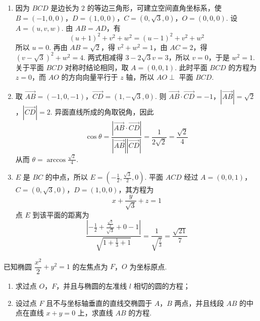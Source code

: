 \begin{solution}
\begin{enumerate}
\item 因为 \(BCD\) 是边长为 \(2\) 的等边三角形，可建立空间直角坐标系，使
\(B=(-1,0,0)\)，\(D=(1,0,0)\)，\(C=(0,\sqrt{3},0)\)，\(O=(0,0,0)\). 设 \(A=(u,v,w)\). 由 \(AB=AD\)，有
\[
(u+1)^2+v^2+w^2=(u-1)^2+v^2+w^2
\]
所以 \(u=0\). 再由 \(AB=\sqrt{2}\)，得 \(v^2+w^2=1\)，由 \(AC=2\)，得
\((v-\sqrt{3})^2+w^2=4\). 两式相减得 \(3-2\sqrt{3}v=3\)，所以 \(v=0\)，于是 \(w^2=1\). 关于平面 \(BCD\) 对称时结论相同，取 \(A=(0,0,1)\). 此时平面 \(BCD\) 的方程为 \(z=0\)，而 \(AO\) 的方向向量平行于 \(z\) 轴，所以 \(AO\perp\) 平面 \(BCD\).
\item 取 \(\overrightarrow{AB}=(-1,0,-1)\)，\(\overrightarrow{CD}=(1,-\sqrt{3},0)\). 则
\(\overrightarrow{AB}\cdot\overrightarrow{CD}=-1\)，\(\left|\overrightarrow{AB}\right|=\sqrt{2}\)，\(\left|\overrightarrow{CD}\right|=2\). 异面直线所成的角取锐角，因此
\[
\cos\theta=\frac{\left|\overrightarrow{AB}\cdot\overrightarrow{CD}\right|}{\left|\overrightarrow{AB}\right|\left|\overrightarrow{CD}\right|}=\frac{1}{2\sqrt{2}}=\frac{\sqrt{2}}{4}
\]
从而 \(\theta=\arccos\frac{\sqrt{2}}{4}\).
\item \(E\) 是 \(BC\) 的中点，所以 \(E=\left(-\frac{1}{2},\frac{\sqrt{3}}{2},0\right)\). 平面 \(ACD\) 经过 \(A=(0,0,1)\)，\(C=(0,\sqrt{3},0)\)，\(D=(1,0,0)\)，其方程为
\[
x+\frac{y}{\sqrt{3}}+z=1
\]
点 \(E\) 到该平面的距离为
\[
\frac{\left|-\frac{1}{2}+\frac{\frac{\sqrt{3}}{2}}{\sqrt{3}}+0-1\right|}{\sqrt{1+\frac{1}{3}+1}}
=\frac{1}{\sqrt{\frac{7}{3}}}
=\frac{\sqrt{21}}{7}
\]
\end{enumerate}
\end{solution}

\begin{problem}
已知椭圆 \(\dfrac{x^2}{2} + y^2 = 1\) 的左焦点为 \(F\)，\(O\) 为坐标原点.
\begin{enumerate}
\item 求过点 \(O\)，\(F\)，并且与椭圆的左准线 \(l\) 相切的圆的方程；
\item 设过点 \(F\) 且不与坐标轴垂直的直线交椭圆于 \(A\)，\(B\) 两点，并且线段 \(AB\) 的中点在直线 \(x + y = 0\) 上，求直线 \(AB\) 的方程.
\end{enumerate}

\end{problem}

